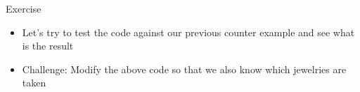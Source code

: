 \documentclass[10pt,xcolor={table,dvipsnames},t]{beamer}
\begin{document}
\begin{frame}{Exercise}
  \begin{itemize}
    \item Let's try to test the code against our previous counter example and see what is the result
    \item Challenge: Modify the above code so that we also know which jewelries are taken
  \end{itemize}
\end{frame}

\end{document}
